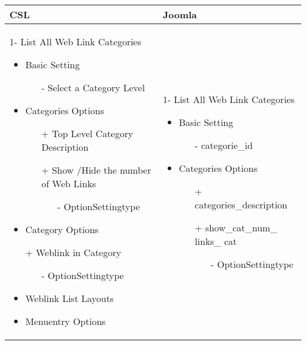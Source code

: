 \begin{minipage}{0.7\textwidth}
\begin{tabular}{|p{} | p{}|}
\hline
\textbf{CSL} & \textbf{Joomla} \\ 
\hline
 1- List All Web Link Categories
   \begin{itemize}
     \item Basic  Setting 
    		\begin{enumerate}
    			\item[-] Select a Category Level
    		\end{enumerate}
    	\item Categories Options
 	   	\begin{enumerate}
 	    \item[+] Top Level Category Description
 	    \item[+] Show /Hide the number of Web Links 
 	    	  \begin{enumerate}
 	    			 \item[-] OptionSettingtype
 	    	\end{enumerate}
 	   \end{enumerate}
    	\item Category Options
    	\item[+] Weblink in Category 
    		    	  \begin{enumerate}
    		    			 \item[-] OptionSettingtype
    		    	\end{enumerate}
    \item Weblink List Layouts
 	\item Menuentry Options
  \end{itemize}
 & 
1- List All Web Link Categories
  \begin{itemize}
    \item Basic  Setting 
   		\begin{enumerate}
   			\item[-] categorie\_id
   		\end{enumerate}
   	\item Categories Options
	   	\begin{enumerate}
	    \item[+]categories\_description
	    \item[+]show\_cat\_num\_ links\_ cat 
	    	  \begin{enumerate}
	    			 \item[-] OptionSettingtype
	    	\end{enumerate}

\end{enumerate}
\end{itemize}
\end{tabular}
\end{minipage}
